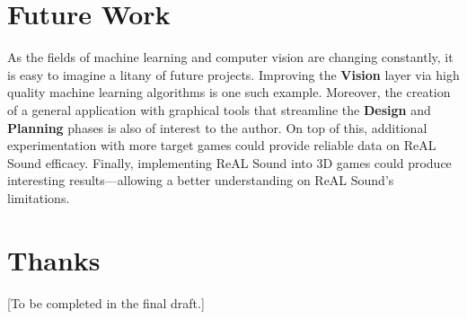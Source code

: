 \documentclass{report}
\newcommand{\rs}{ReAL Sound\xspace}
\newcommand{\plan}{\textbf{Planning}\xspace}
\newcommand{\design}{\textbf{Design}\xspace}
\newcommand{\vision}{\textbf{Vision}\xspace}
\begin{document}
\section{Future Work}
As the fields of machine learning and computer vision are changing constantly, it is easy to imagine a litany of future projects. Improving the \vision layer via high quality machine learning algorithms is one such example. Moreover, the creation of a general application with graphical tools that streamline the \design and \plan phases is also of interest to the author. On top of this, additional experimentation with more target games could provide reliable data on \rs efficacy. Finally, implementing \rs into 3D games could produce interesting results---allowing a better understanding on \rs's limitations.

\section{Thanks}
[To be completed in the final draft.]

% 
\printbibliography
\end{document}
